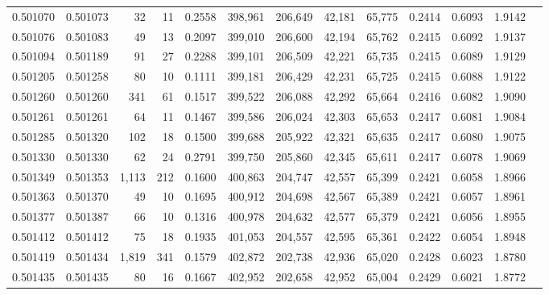 \begin{tabular}{rrrrrrrrrrrrr}
0.501070 & 0.501073 &    32 &    11 &                                     0.2558 & 398,961 & 206,649 &  42,181 &  65,775 & 0.2414 & 0.6093 & 1.9142 \\
0.501076 & 0.501083 &    49 &    13 &                                     0.2097 & 399,010 & 206,600 &  42,194 &  65,762 & 0.2415 & 0.6092 & 1.9137 \\
0.501094 & 0.501189 &    91 &    27 &                                     0.2288 & 399,101 & 206,509 &  42,221 &  65,735 & 0.2415 & 0.6089 & 1.9129 \\
0.501205 & 0.501258 &    80 &    10 &                                     0.1111 & 399,181 & 206,429 &  42,231 &  65,725 & 0.2415 & 0.6088 & 1.9122 \\
0.501260 & 0.501260 &   341 &    61 &                                     0.1517 & 399,522 & 206,088 &  42,292 &  65,664 & 0.2416 & 0.6082 & 1.9090 \\
0.501261 & 0.501261 &    64 &    11 &                                     0.1467 & 399,586 & 206,024 &  42,303 &  65,653 & 0.2417 & 0.6081 & 1.9084 \\
0.501285 & 0.501320 &   102 &    18 &                                     0.1500 & 399,688 & 205,922 &  42,321 &  65,635 & 0.2417 & 0.6080 & 1.9075 \\
0.501330 & 0.501330 &    62 &    24 &                                     0.2791 & 399,750 & 205,860 &  42,345 &  65,611 & 0.2417 & 0.6078 & 1.9069 \\
0.501349 & 0.501353 & 1,113 &   212 &                                     0.1600 & 400,863 & 204,747 &  42,557 &  65,399 & 0.2421 & 0.6058 & 1.8966 \\
0.501363 & 0.501370 &    49 &    10 &                                     0.1695 & 400,912 & 204,698 &  42,567 &  65,389 & 0.2421 & 0.6057 & 1.8961 \\
0.501377 & 0.501387 &    66 &    10 &                                     0.1316 & 400,978 & 204,632 &  42,577 &  65,379 & 0.2421 & 0.6056 & 1.8955 \\
0.501412 & 0.501412 &    75 &    18 &                                     0.1935 & 401,053 & 204,557 &  42,595 &  65,361 & 0.2422 & 0.6054 & 1.8948 \\
0.501419 & 0.501434 & 1,819 &   341 &                                     0.1579 & 402,872 & 202,738 &  42,936 &  65,020 & 0.2428 & 0.6023 & 1.8780 \\
0.501435 & 0.501435 &    80 &    16 &                                     0.1667 & 402,952 & 202,658 &  42,952 &  65,004 & 0.2429 & 0.6021 & 1.8772 \\

\end{tabular}
